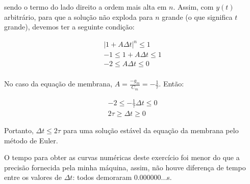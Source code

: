 \documentclass[portuguese,12pt,a4paper]{article}
\begin{document}
	sendo o termo do lado direito a ordem mais alta em $n$. Assim, com $y(t)$ arbitrário, para que a solução não exploda para $n$ grande (o que significa $t$ grande), devemos ter a seguinte condição:
	
	\begin{align*}
		|1 + A\Delta t|^n \le 1 \\
		-1 \le 1 + A\Delta t \le 1 \\
		-2 \le A\Delta t \le 0 \\		
	\end{align*}
	
	No caso da equação de membrana, $A = \frac{-g_m}{C_m} = -\frac{1}{\tau}$. Então:
	
	\begin{align*}
		-2 \le -\frac{1}{\tau}\Delta t \le 0 \\
		2\tau \ge \Delta t \ge 0
	\end{align*}
	
	Portanto, $\Delta t \le 2\tau$ para uma solução estável da equação da membrana pelo método de Euler.
	
	O tempo para obter as curvas numéricas deste exercício foi menor do que a precisão fornecida pela minha máquina, assim, não houve diferença de tempo entre os valores de $\Delta t$: todos demoraram 0.000000...s.
	
	
	
	
	
	
	
\end{document}
